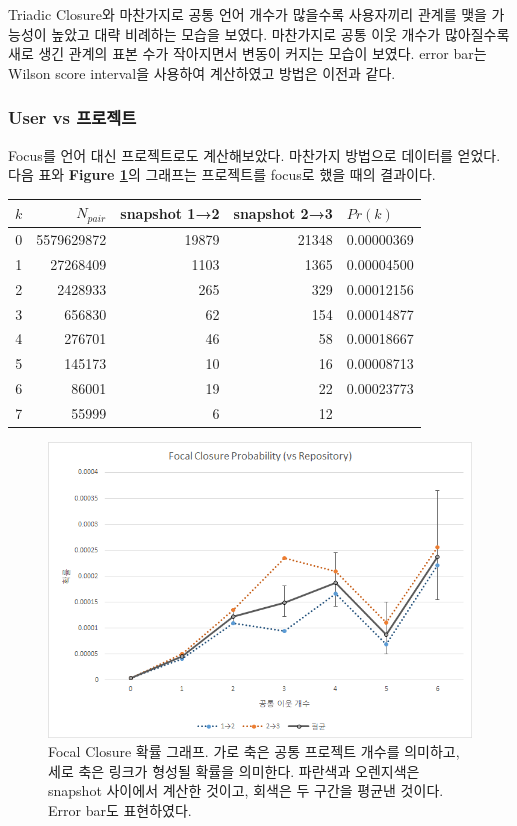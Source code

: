 \documentclass[10pt, a4paper, titlepage]{article}
\begin{document}
Triadic Closure와 마찬가지로 공통 언어 개수가 많을수록 사용자끼리 관계를 맺을 가능성이 높았고 대략 비례하는 모습을 보였다. 마찬가지로 공통 이웃 개수가 많아질수록 새로 생긴 관계의 표본 수가 작아지면서 변동이 커지는 모습이 보였다.
error bar는 Wilson score interval을 사용하여 계산하였고 방법은 이전과 같다.

\FloatBarrier


\subsubsection{User vs 프로젝트}

Focus를 언어 대신 프로젝트로도 계산해보았다. 마찬가지 방법으로 데이터를 얻었다. 다음 표와 {\bf Figure \ref{fig:focalrepo}}의 그래프는 프로젝트를 focus로 했을 때의 결과이다.

\begin{longtable}{|c|r|r|r|l|}

\hline
\rowcolor[gray]{0.8}
$k$ & 
$N_{pair}$ & 
snapshot 1→2 &
snapshot 2→3 & 
$Pr(k)$ \\ \hline
0 &
5579629872 &
19879 &
21348 &
0.00000369 \\ \hline
1 &
27268409 &
1103 &
1365 &
0.00004500 \\ \hline
2 &
2428933 &
265 &
329 &
0.00012156 \\ \hline
3 &
656830 &
62 &
154 &
0.00014877 \\ \hline
4 &
276701 &
46 &
58 &
0.00018667 \\ \hline
5 &
145173 &
10 &
16 &
0.00008713 \\ \hline
6 &
86001 &
19 &
22 &
0.00023773 \\ \hline
7 &
55999 &
6 &
12 &
 \\ \hline

\end{longtable}


\begin{figure}
\includegraphics[width=\textwidth]{image07}
\caption{Focal Closure 확률 그래프. 가로 축은 공통 프로젝트 개수를 의미하고, 세로 축은 링크가 형성될 확률을 의미한다. 파란색과 오렌지색은 snapshot 사이에서 계산한 것이고, 회색은 두 구간을 평균낸 것이다. Error bar도 표현하였다.}
\label{fig:focalrepo}
\end{figure}
\end{document}
